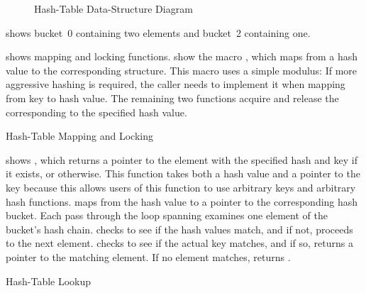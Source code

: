 \begin{figure}
\centering
{}
\caption{Hash-Table Data-Structure Diagram}
\label{fig:datastruct:Hash-Table Data-Structure Diagram}
\end{figure}

shows bucket~0 containing two elements and bucket~2 containing one.

\begin{fcvref}
shows mapping and locking functions.
show the macro , which maps from a hash value
to the corresponding  structure.
This macro uses a simple modulus:
If more aggressive hashing is required,
the caller needs to implement it when mapping from key to hash value.
The remaining two functions acquire and release the 
corresponding to the specified hash value.
\end{fcvref}

\begin{listing}

\caption{Hash-Table Mapping and Locking}
\label{lst:datastruct:Hash-Table Mapping and Locking}
\end{listing}

\begin{fcvref}
shows ,
which returns a pointer to the element with the specified hash and key if it
exists, or  otherwise.
This function takes both a hash value and a pointer to the key because
this allows users of this function to use arbitrary keys and
arbitrary hash functions.
 maps from the hash value to a pointer to the corresponding
hash bucket.
Each pass through the loop spanning
 examines one element
of the bucket's hash chain.
 checks to see if the hash values match, and if not,
proceeds to the next element.
 checks to see if the actual key matches, and if so,
 returns a pointer to the matching element.
If no element matches,  returns .
\end{fcvref}

\begin{listing}

\caption{Hash-Table Lookup}
\label{lst:datastruct:Hash-Table Lookup}
\end{listing}

